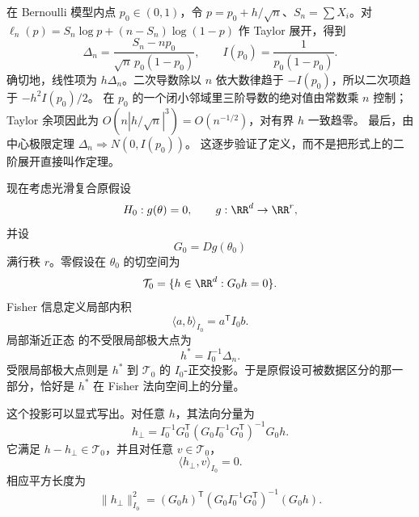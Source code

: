 \begin{workedexample}
在 Bernoulli 模型内点 \(p_0\in(0,1)\)，令
\(p=p_0+h/\sqrt n\)、\(S_n=\sum X_i\)。对
\(\ell_n(p)=S_n\log p+(n-S_n)\log(1-p)\) 作 Taylor 展开，得到
\[
\Delta_n=\frac{S_n-np_0}{\sqrt n\,p_0(1-p_0)},\qquad
I(p_0)=\frac1{p_0(1-p_0)}.
\]
确切地，线性项为 \(h\Delta_n\)。二次导数除以 \(n\) 依大数律趋于
\(-I(p_0)\)，所以二次项趋于 \(-h^2I(p_0)/2\)。
在 \(p_0\) 的一个闭小邻域里三阶导数的绝对值由常数乘 \(n\) 控制；
Taylor 余项因此为
\(O(n|h/\sqrt n|^3)=O(n^{-1/2})\)，对有界 \(h\) 一致趋零。
最后，由中心极限定理 \(\Delta_n\Rightarrow N(0,I(p_0))\)。
这逐步验证了定义，而不是把形式上的二阶展开直接叫作定理。
\end{workedexample}

\begin{proposition}
现在考虑光滑复合原假设
\[
 H_0:g(\theta)=0,
 \qquad
 g:\RR^d\to\RR^r,
\]
并设
\[
 G_0=Dg(\theta_0)
\]
满行秩 $r$。零假设在 $\theta_0$ 的切空间为
\[
 \mathcal T_0
 =\{h\in\RR^d:G_0h=0\}.
\]
Fisher 信息定义局部内积
\[
 \langle a,b\rangle_{I_0}
 =a^{\mathsf T}I_0b.
\]
局部渐近正态 的不受限局部极大点为
\[
 h^*=I_0^{-1}\Delta_n.
\]
受限局部极大点则是 $h^*$ 到 $\mathcal T_0$ 的 $I_0$-正交投影。于是原假设可被数据区分的那一部分，恰好是 $h^*$ 在 Fisher 法向空间上的分量。

这个投影可以显式写出。对任意 $h$，其法向分量为
\begin{equation}\label{eq:math-stat-fisher-normal-projection}
 h_\perp
 =I_0^{-1}G_0^{\mathsf T}
 (G_0I_0^{-1}G_0^{\mathsf T})^{-1}
 G_0h.
\end{equation}
它满足 $h-h_\perp\in\mathcal T_0$，并且对任意 $v\in\mathcal T_0$，
\[
 \langle h_\perp,v\rangle_{I_0}=0.
\]
相应平方长度为
\begin{equation}\label{eq:math-stat-fisher-normal-distance}
 \|h_\perp\|_{I_0}^2
 =(G_0h)^{\mathsf T}
 (G_0I_0^{-1}G_0^{\mathsf T})^{-1}
 (G_0h).
\end{equation}
\end{proposition}

